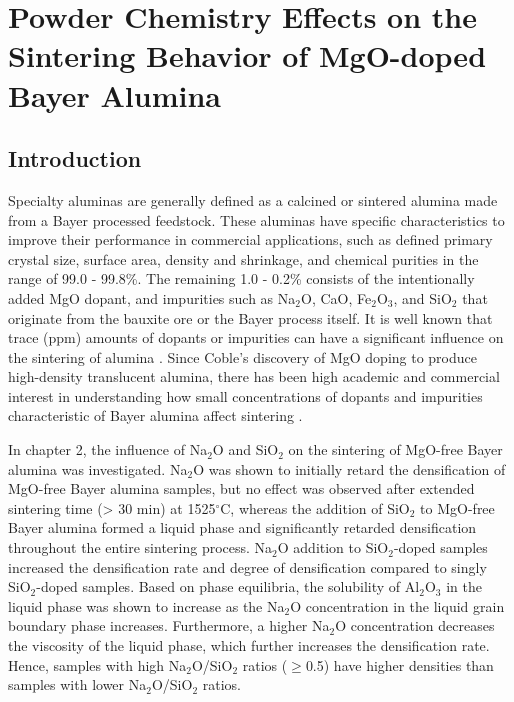 \chapter{Powder Chemistry Effects on the Sintering Behavior of MgO-doped Bayer Alumina}

\section{Introduction}
Specialty aluminas are generally defined as a calcined or sintered alumina made from a Bayer processed feedstock. These aluminas have specific characteristics to improve their performance in commercial applications, such as defined primary crystal size, surface area, density and shrinkage, and chemical purities in the range of 99.0 - 99.8\%. The remaining 1.0 - 0.2\% consists of the intentionally added MgO dopant, and impurities such as Na$_{2}$O, CaO, Fe$_{2}$O$_{3}$, and SiO$_{2}$ that originate from the bauxite ore or the Bayer process itself. It is well known that trace (ppm) amounts of dopants or impurities can have a significant influence on the sintering of alumina \cite{Bae1994,Bae1997,Bae1993}. Since Coble's discovery of MgO doping to produce high-density translucent alumina, there has been high academic and commercial interest in understanding how small concentrations of dopants and impurities characteristic of Bayer alumina affect sintering \cite{Bennison1990,Jorgensen1965,Heuer1979,Louet2005a,Park2000a}.

In chapter 2, the influence of Na$_{2}$O and SiO$_{2}$ on the sintering of MgO-free Bayer alumina was investigated. Na$_{2}$O was shown to initially retard the densification of MgO-free Bayer alumina samples, but no effect was observed after extended sintering time (> 30 min) at 1525$^{\circ}$C, whereas the addition of SiO$_{2}$ to MgO-free Bayer alumina formed a liquid phase and significantly retarded densification throughout the entire sintering process. Na$_{2}$O addition to SiO$_{2}$-doped samples increased the densification rate and degree of densification compared to singly SiO$_{2}$-doped samples. Based on phase equilibria, the solubility of Al$_{2}$O$_{3}$ in the liquid phase was shown to increase as the Na$_{2}$O concentration in the liquid grain boundary phase increases. Furthermore, a higher Na$_{2}$O concentration decreases the viscosity of the liquid phase, which further increases the densification rate. Hence, samples with high Na$_{2}$O/SiO$_{2}$ ratios ($\geq$0.5) have higher densities than samples with lower Na$_{2}$O/SiO$_{2}$ ratios. 

